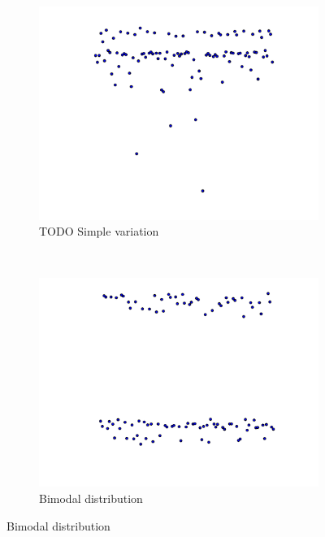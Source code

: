 \documentclass[conference]{IEEEtran}
\begin{document}
\begin{figure}
\centering

\begin{subfigure}{0.22\textwidth}
    \centering
    \includegraphics[width=\textwidth]{figures/fig1/simple_branchsum_fast}
    \caption{TODO Simple variation}
\end{subfigure}%
~
\begin{subfigure}{0.22\textwidth}
    \centering
    \includegraphics[width=\textwidth]{figures/fig1/bimodal_branchsum}
    \caption{Bimodal distribution}
\end{subfigure}


\end{figure}
\end{document}
